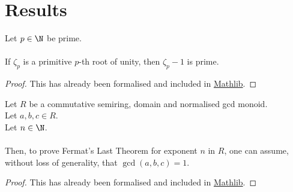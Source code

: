 \section{Results}

\begin{theorem}
    \label{thm:zeta_sub_one_prime1}
    \leanok
    Let $p \in \N$ be prime. \\\\
    If $\zeta_p$ is a primitive $p$-th root of unity, then $\zeta_p - 1$ is prime.
\end{theorem}
\begin{proof}
    \leanok
    This has already been formalised and included in \href{https://pitmonticone.github.io/FLT3/docs/FLT3/Mathlib/NumberTheory/Cyclotomic/Rat.html#IsPrimitiveRoot.zeta_sub_one_prime'}{Mathlib}.
\end{proof}

\begin{lemma}
    \label{lmm:fermatLastTheoremWith_of_fermatLastTheoremWith_coprime}
    \leanok
    Let $R$ be a commutative semiring, domain and normalised gcd monoid.\\%
    Let $a, b, c \in R$. \\
    Let $n \in \N$. \\\\
    Then, to prove Fermat's Last Theorem for exponent $n$ in $R$,
    one can assume, without loss of generality, that $\gcd(a,b,c)=1$.
  \end{lemma}
  \begin{proof}
    \leanok
    This has already been formalised and included in \href{https://pitmonticone.github.io/FLT3/docs/FLT3/Mathlib/NumberTheory/FLT/Basic.html#fermatLastTheoremWith_of_fermatLastTheoremWith_coprime}{Mathlib}.
  \end{proof}